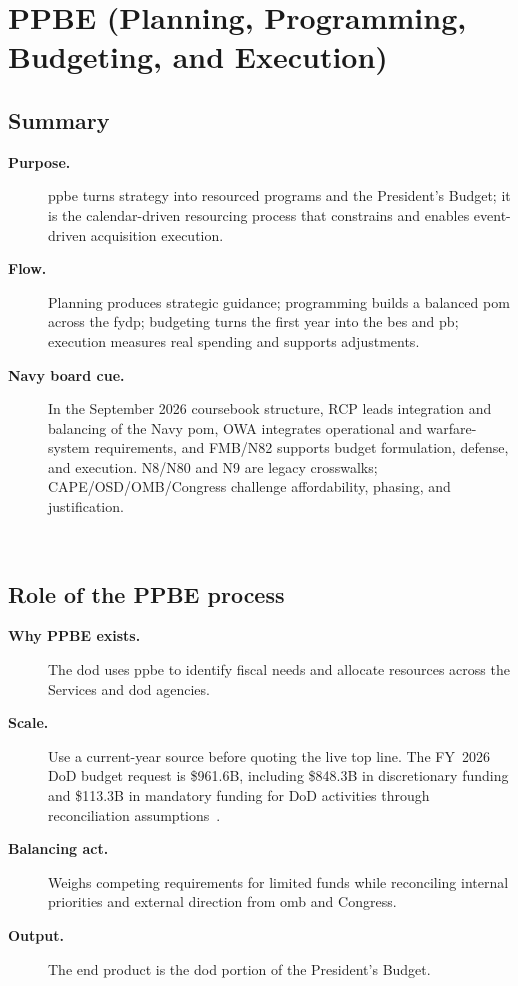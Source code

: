 \documentclass[../main.tex]{subfiles}
\begin{document}

\section{PPBE (Planning, Programming, Budgeting, and Execution)}

\subsection{Summary}
\begin{description}
  \item[\textbf{Purpose.}] \ac{ppbe} turns strategy into resourced programs and the President's Budget; it is the
  calendar-driven resourcing process that constrains and enables event-driven acquisition execution.
  \item[\textbf{Flow.}] Planning produces strategic guidance; programming builds a balanced \ac{pom} across the
  \ac{fydp}; budgeting turns the first year into the \ac{bes} and \ac{pb}; execution measures real spending and
  supports adjustments.
  \item[\textbf{Navy board cue.}] In the September 2026 coursebook structure, RCP leads integration and balancing
  of the Navy \ac{pom}, OWA integrates operational and warfare-system requirements, and FMB/N82 supports budget
  formulation, defense, and execution. N8/N80 and N9 are legacy crosswalks; CAPE/OSD/OMB/Congress challenge
  affordability, phasing, and justification.
\end{description}
~

\subsection{Role of the PPBE process}
\begin{description}
  \item[\textbf{Why PPBE exists.}] The \ac{dod} uses \ac{ppbe} to identify fiscal needs and allocate resources across the Services and \ac{dod} agencies.
  \item[\textbf{Scale.}] Use a current-year source before quoting the live top line. The FY~2026 DoD budget request is
  \$961.6B, including \$848.3B in discretionary funding and \$113.3B in mandatory funding for DoD activities
  through reconciliation assumptions~\autocite{DoD-FY2026-Budget-Overview}.
  \item[\textbf{Balancing act.}] Weighs competing requirements for limited funds while reconciling internal priorities and external direction from \ac{omb} and Congress.
  \item[\textbf{Output.}] The end product is the \ac{dod} portion of the President's Budget.
\end{description}
~
\end{document}
